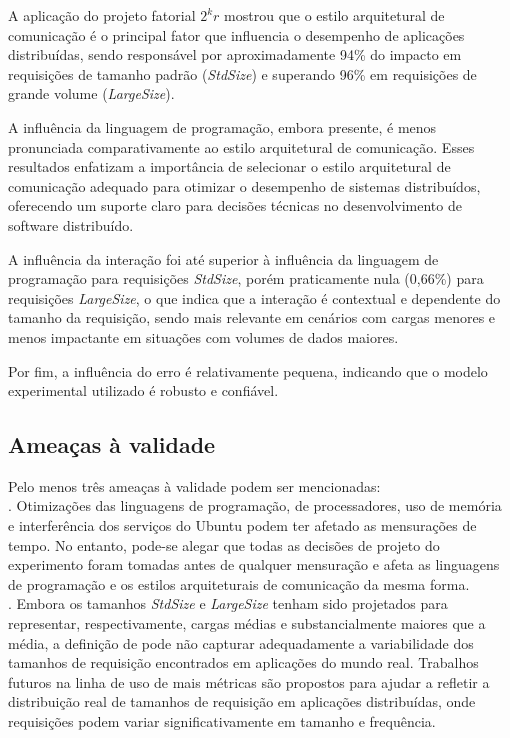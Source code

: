 A aplicação do projeto fatorial \(2^{k}r\) mostrou que o estilo arquitetural de comunicação é o principal fator que influencia o desempenho de aplicações distribuídas, sendo responsável por aproximadamente 94\% do impacto em requisições de tamanho padrão ({\em StdSize}) e superando 96\% em requisições de grande volume ({\em LargeSize}).

A influência da linguagem de programação, embora presente, é menos pronunciada comparativamente ao estilo arquitetural de comunicação. 
Esses resultados enfatizam a importância de selecionar o estilo arquitetural de comunicação adequado para otimizar o desempenho de sistemas distribuídos, oferecendo um suporte claro para decisões técnicas no desenvolvimento de software distribuído.

A influência da interação foi até superior à influência da linguagem de programação para requisições {\em StdSize}, porém 
praticamente nula (0,66\%) para requisições {\em LargeSize}, o que indica que a interação é contextual e dependente do tamanho da requisição, sendo mais relevante em cenários com cargas menores e menos impactante em situações com volumes de dados maiores.

Por fim, a influência do erro é relativamente pequena, indicando que o modelo experimental utilizado é robusto e confiável.

\subsection{Ameaças à validade}
Pelo menos três ameaças à validade podem ser mencionadas:\\[-0.3cm]

. Otimizações das linguagens de programação, de processadores, uso de memória e interferência dos serviços do Ubuntu podem ter afetado as mensurações de tempo. No entanto, pode-se alegar que todas as decisões de projeto do experimento foram tomadas antes de qualquer mensuração e afeta as linguagens de programação e os estilos arquiteturais de comunicação da mesma forma.\\[-0.3cm]

.  Embora os tamanhos \textit{StdSize} e \textit{LargeSize} tenham sido projetados para representar, respectivamente, cargas médias e substancialmente maiores que a média, a definição de  pode não capturar adequadamente a variabilidade dos tamanhos de requisição encontrados em aplicações do mundo real. Trabalhos futuros na linha de uso de mais métricas são propostos para ajudar a refletir a distribuição real de tamanhos de requisição em aplicações distribuídas, onde requisições podem variar significativamente em tamanho e frequência.\\[-0.3cm]

